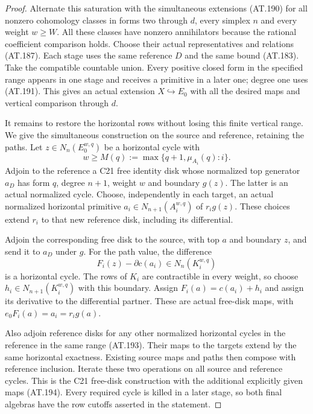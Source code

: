\begin{proof}
Alternate this saturation with the simultaneous
extensions (AT.190) for all nonzero cohomology
classes in forms two through $d$, every
simplex $n$ and every weight $w\geq W$.
All these classes have nonzero annihilators
because the rational coefficient comparison
holds. Choose their actual representatives
and relations (AT.187).
Each stage uses the same reference $D$ and
the same bound (AT.183).
Take the compatible countable union.
Every positive closed form in the specified
range appears in one stage and receives a
primitive in a later one; degree one uses
(AT.191). This gives an actual extension
$X\hookrightarrow E_0$ with all the desired
maps and vertical comparison through $d$.

It remains to restore the horizontal rows
without losing this finite vertical range.
We give the simultaneous construction on
the source and reference, retaining the paths.
Let $z\in N_n(E_0^{w,q})$ be a horizontal
cycle with
\[
                  w\geq M(q):=
                    \max\{q+1,\mu_{A_i}(q):i\}.
 \tag{AT.193}
\]
Adjoin to the reference a C21 free identity
disk whose normalized top generator $a_D$
has form $q$, degree $n+1$, weight $w$ and
boundary $g(z)$.
The latter is an actual normalized cycle.
Choose, independently in each target, an
actual normalized horizontal primitive
$a_i\in N_{n+1}(A_i^{w,q})$ of $r_i g(z)$.
These choices extend $r_i$ to that new
reference disk, including its differential.

Adjoin the corresponding free disk to the
source, with top $a$ and boundary $z$, and
send it to $a_D$ under $g$.
For the path value, the difference
\[
                   F_i(z)-\partial c(a_i)
                     \in N_n(K_i^{w,q})
 \tag{AT.194}
\]
is a horizontal cycle.
The rows of $K_i$ are contractible in every
weight, so choose
$h_i\in N_{n+1}(K_i^{w,q})$ with this boundary.
Assign
$F_i(a)=c(a_i)+h_i$ and assign its derivative
to the differential partner.
These are actual free-disk maps, with
$e_0F_i(a)=a_i=r_i g(a)$.

Also adjoin reference disks for any other
normalized horizontal cycles in the reference
in the same range (AT.193).
Their maps to the targets extend by the same
horizontal exactness. Existing source maps
and paths then compose with reference inclusion.
Iterate these two operations on all source
and reference cycles.
This is the C21 free-disk construction with
the additional explicitly given maps
(AT.194). Every required cycle is killed in
a later stage, so both final algebras have
the row cutoffs asserted in the statement.


\end{proof}
